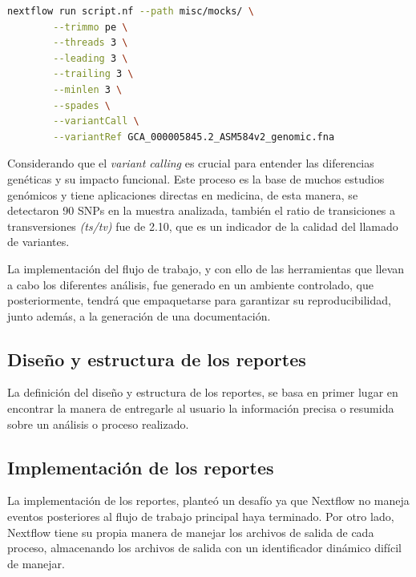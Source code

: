 \documentclass[12pt]{article}
\begin{document}
\begin{center}
    \begin{lstlisting}[language=bash, caption=Comando para realizar un llama de variantes en \textit{Escherichia coli} \emph{(elaboración propia)}., label=lst:VARIANTCaso1]
        nextflow run script.nf --path misc/mocks/ \
        --trimmo pe \
        --threads 3 \
        --leading 3 \
        --trailing 3 \
        --minlen 3 \
        --spades \
        --variantCall \
        --variantRef GCA_000005845.2_ASM584v2_genomic.fna 
    \end{lstlisting}
\end{center}

Considerando que el \emph{variant calling} es 
crucial para entender las diferencias genéticas y 
su impacto funcional. Este proceso es la base de
muchos estudios genómicos y tiene aplicaciones 
directas en medicina, de esta manera, se detectaron 
90 SNPs en la muestra analizada, también el ratio 
de transiciones a transversiones \emph{(ts/tv)} 
fue de 2.10, 
que es un indicador de la calidad del llamado de 
variantes. 

La implementación del flujo de trabajo, y con 
ello de las herramientas que llevan a cabo los 
diferentes análisis, fue generado en un ambiente 
controlado, que posteriormente, tendrá que empaquetarse 
para garantizar su reproducibilidad, junto además, 
a la generación de una documentación.

\subsection{Diseño y estructura de los reportes}

La definición del diseño y estructura de los 
reportes, se basa en primer lugar en encontrar 
la manera de entregarle al usuario la información 
precisa o resumida sobre un análisis o proceso 
realizado.

\subsection{Implementación de los reportes}

La implementación de los reportes, planteó un desafío ya que Nextflow 
no maneja eventos posteriores al  flujo de trabajo principal haya terminado. 
Por otro lado, Nextflow tiene su propia manera de manejar los archivos de 
salida de cada proceso, almacenando los archivos de salida con un 
identificador dinámico difícil de manejar.
\end{document}
